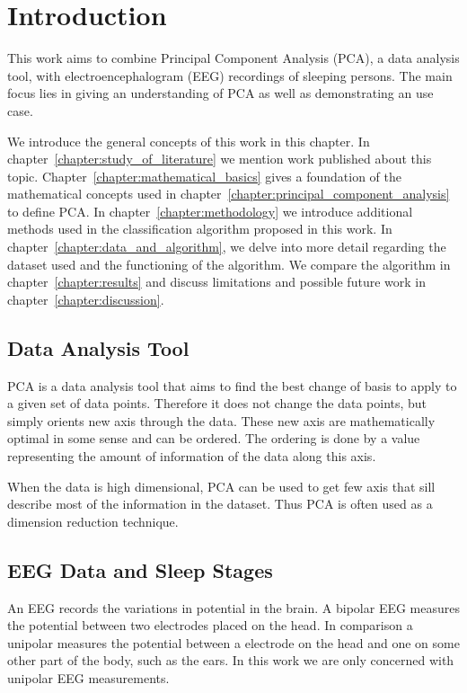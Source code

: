 \chapter{Introduction}
\label{chapter:introduction}

This work aims to combine Principal Component Analysis (PCA), a data analysis tool, with electroencephalogram (EEG) recordings of sleeping persons. The main focus lies in giving an understanding of PCA as well as demonstrating an use case.

We introduce the general concepts of this work in this chapter. In chapter~\ref{chapter:study_of_literature} we mention work published about this topic. Chapter~\ref{chapter:mathematical_basics} gives a foundation of the mathematical concepts used in chapter~\ref{chapter:principal_component_analysis} to define PCA. In chapter~\ref{chapter:methodology} we introduce additional methods used in the classification algorithm proposed in this work. In chapter~\ref{chapter:data_and_algorithm}, we delve into more detail regarding the dataset used and the functioning of the algorithm. We compare the algorithm in chapter~\ref{chapter:results} and discuss limitations and possible future work in chapter~\ref{chapter:discussion}.

\section{Data Analysis Tool}

PCA is a data analysis tool that aims to find the best change of basis to apply to a given set of data points. Therefore it does not change the data points, but simply orients new axis through the data. These new axis are mathematically optimal in some sense and can be ordered. The ordering is done by a value representing the amount of information of the data along this axis.

When the data is high dimensional, PCA can be used to get few axis that sill describe most of the information in the dataset. Thus PCA is often used as a dimension reduction technique.


\section{EEG Data and Sleep Stages}
\label{sec:eeg_data_and_sleep_stages}

An EEG records the variations in potential in the brain. A bipolar EEG measures the potential between two electrodes placed on the head. In comparison a unipolar measures the potential between a electrode on the head and one on some other part of the body, such as the ears. In this work we are only concerned with unipolar EEG measurements.

